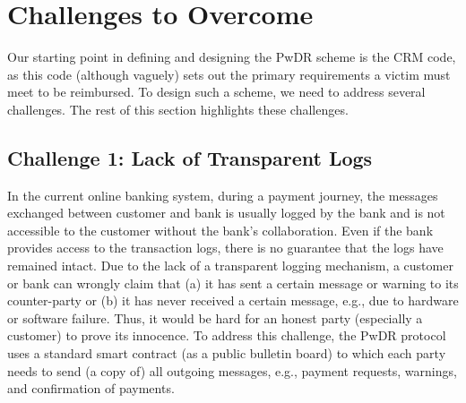 

\section{Challenges to Overcome}


Our starting point in defining and  designing the PwDR scheme is the CRM code, as this code (although vaguely) sets out the primary requirements a victim must meet to be reimbursed.  To design such a scheme, we need to address  several challenges. The rest of this section  highlights these challenges. 





\subsection{Challenge 1: Lack of Transparent Logs} 
In the current online  banking system, during a payment journey, the messages exchanged between customer and bank is usually logged by the bank and is not accessible to the customer without the bank's collaboration. Even if the bank provides access to the transaction logs, there is no guarantee that the logs have remained intact. Due to the lack of a transparent logging mechanism, a customer or bank can wrongly claim that (a) it has sent a certain message or warning to its counter-party or (b) it has never  received a certain message, e.g., due to hardware or software failure.  Thus, it would be hard for an honest party (especially a customer) to prove its innocence. To address this challenge, the PwDR protocol uses a standard smart contract (as a public bulletin board) to which  each party needs to send (a copy of) all outgoing messages, e.g., payment requests, warnings, and  confirmation of payments. 




